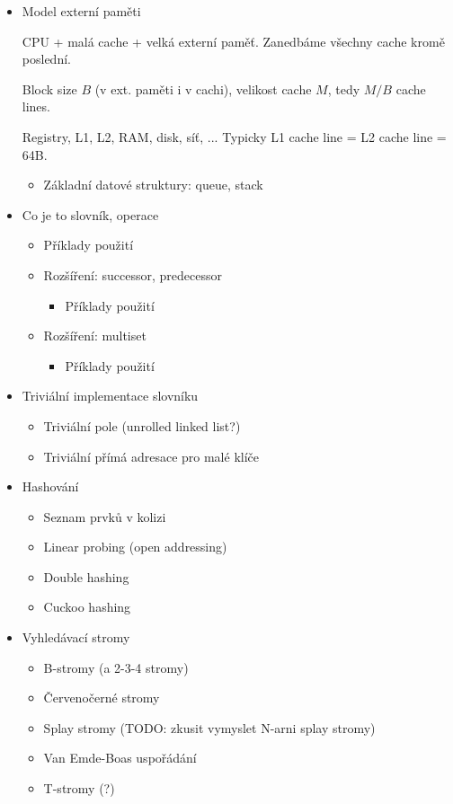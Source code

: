 \begin{itemize}
\item Model externí paměti

	CPU + malá cache + velká externí paměť.
	Zanedbáme všechny cache kromě poslední.

	Block size $B$ (v ext. paměti i v cachi),
	velikost cache $M$, tedy $M/B$ cache lines.

	Registry, L1, L2, RAM, disk, síť, ...
	Typicky L1 cache line = L2 cache line = 64B.
	\cite{Vit}

	\begin{itemize}
	\item Základní datové struktury: queue, stack
	\end{itemize}

\item Co je to slovník, operace
	\begin{itemize}
	\item Příklady použití
	\item Rozšíření: successor, predecessor
		\begin{itemize}
		\item Příklady použití
		\end{itemize}
	\item Rozšíření: multiset
		\begin{itemize}
		\item Příklady použití
		\end{itemize}
	\end{itemize}

\item Triviální implementace slovníku
	\begin{itemize}
	\item Triviální pole (unrolled linked list?)
	\item Triviální přímá adresace pro malé klíče
	\end{itemize}

\item Hashování
	\begin{itemize}
		\item Seznam prvků v kolizi
		\item Linear probing (open addressing)
		\item Double hashing
		\item Cuckoo hashing
	\end{itemize}

\item Vyhledávací stromy
	\begin{itemize}
		\item B-stromy (a 2-3-4 stromy)
		\item Červenočerné stromy
		\item Splay stromy (TODO: zkusit vymyslet N-arni splay stromy)
		\item Van Emde-Boas uspořádání
		\item T-stromy (?)
	\end{itemize}


\end{itemize}
